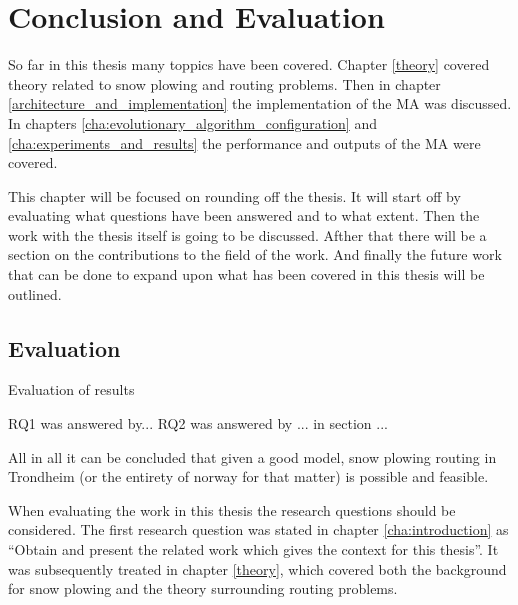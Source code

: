 \chapter{Conclusion and Evaluation}

So far in this thesis many toppics have been covered. Chapter \ref{theory} covered theory related to snow plowing and routing problems. Then in chapter \ref{architecture_and_implementation} the implementation of the MA was discussed. In chapters \ref{cha:evolutionary_algorithm_configuration} and \ref{cha:experiments_and_results} the performance and outputs of the MA were covered.

This chapter will be focused on rounding off the thesis. It will start off by evaluating what questions have been answered and to what extent. Then the work with the thesis itself is going to be discussed. Afther that there will be a section on the contributions to the field of the work. And finally the future work that can be done to expand upon what has been covered in this thesis will be outlined.

\section{Evaluation}
Evaluation of results

RQ1 was answered by...
RQ2 was answered by ... in section ...

All in all it can be concluded that given a good model, snow plowing routing in Trondheim (or the entirety of norway for that matter) is possible and feasible.


When evaluating the work in this thesis the research questions should be considered. The first research question was stated in chapter \ref{cha:introduction} as \enquote{Obtain and present the related work which gives the context for this thesis}. It was subsequently treated in chapter \ref{theory}, which covered both the background for snow plowing and the theory surrounding routing problems. 


